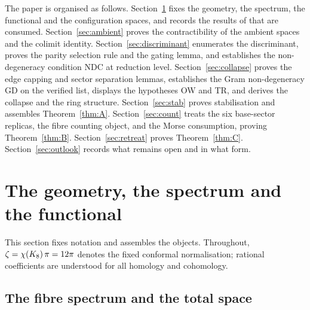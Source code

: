 \documentclass[11pt]{article}
\numberwithin{equation}{section}
\theoremstyle{plain}
\theoremstyle{definition}
\theoremstyle{remark}
\begin{document}
The paper is organised as follows. Section~\ref{sec:setting} fixes
the geometry, the spectrum, the functional and the configuration
spaces, and records the results of \cite{MEF3} that are consumed.
Section~\ref{sec:ambient} proves the contractibility of the ambient
spaces and the colimit identity. Section~\ref{sec:discriminant}
enumerates the discriminant, proves the parity selection rule and
the gating lemma, and establishes the non-degeneracy condition NDC
at reduction level. Section~\ref{sec:collapse} proves the edge
capping and sector separation lemmas, establishes the Gram
non-degeneracy GD on the verified list, displays the hypotheses
OW and TR, and derives the collapse and the ring structure.
Section~\ref{sec:stab} proves stabilisation and assembles
Theorem~\ref{thm:A}. Section~\ref{sec:count} treats the six
base-sector replicas, the fibre counting object, and the Morse
consumption, proving Theorem~\ref{thm:B}.
Section~\ref{sec:retreat} proves Theorem~\ref{thm:C}.
Section~\ref{sec:outlook} records what remains open and in what
form.

\section{The geometry, the spectrum and the
functional}\label{sec:setting}

This section fixes notation and assembles the objects. Throughout,
$\zeta = \chi(K_8)\,\pi = 12\pi$ denotes the fixed conformal
normalisation; rational coefficients are understood for all
homology and cohomology.

\subsection{The fibre spectrum and the total space}
\label{sec:fibrespec}
\end{document}
